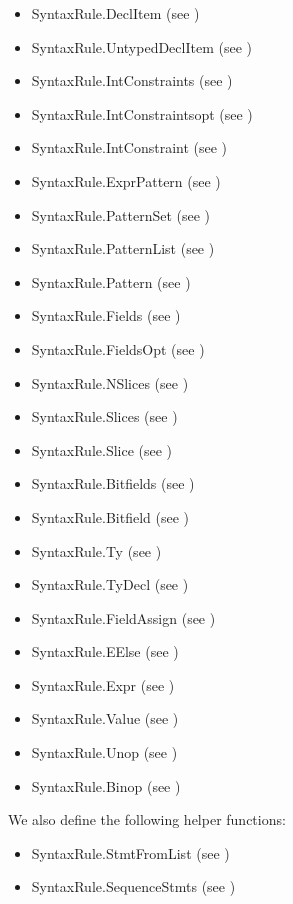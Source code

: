 \documentclass{book}
\begin{document}
\begin{itemize}
  \item SyntaxRule.DeclItem (see )
  \item SyntaxRule.UntypedDeclItem (see )
  \item SyntaxRule.IntConstraints (see )
  \item SyntaxRule.IntConstraintsopt (see )
  \item SyntaxRule.IntConstraint (see )
  \item SyntaxRule.ExprPattern (see )
  \item SyntaxRule.PatternSet (see )
  \item SyntaxRule.PatternList (see )
  \item SyntaxRule.Pattern (see )
  \item SyntaxRule.Fields (see )
  \item SyntaxRule.FieldsOpt (see )
  \item SyntaxRule.NSlices (see )
  \item SyntaxRule.Slices (see )
  \item SyntaxRule.Slice (see )
  \item SyntaxRule.Bitfields (see )
  \item SyntaxRule.Bitfield (see )
  \item SyntaxRule.Ty (see )
  \item SyntaxRule.TyDecl (see )
  \item SyntaxRule.FieldAssign (see )
  \item SyntaxRule.EElse (see )
  \item SyntaxRule.Expr (see )
  \item SyntaxRule.Value (see )
  \item SyntaxRule.Unop (see )
  \item SyntaxRule.Binop (see )
\end{itemize}

We also define the following helper functions:
\begin{itemize}
\item SyntaxRule.StmtFromList (see )
\item SyntaxRule.SequenceStmts (see )
\end{itemize}
\end{document}
